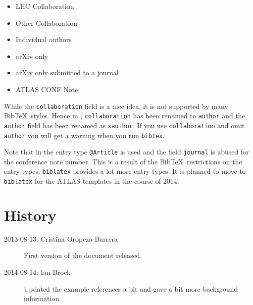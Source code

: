 \documentclass[UKenglish]{latex/atlasdoc}
\newcommand*{\BibTeX}{Bib\TeX}
\begin{document}
\begin{itemize}
\item LHC Collaboration~\cite{lhcCollaboration:2012}
\item Other Collaboration~\cite{otherCollaboration:2007}
\item Individual authors~\cite{authors:2008}
\item arXiv only~\cite{arxivOnly:2009}
\item arXiv only submitted to a journal~\cite{arxivSub:2011}
\item ATLAS CONF Note~\cite{atlasConf:2012} 
\end{itemize}

While the \texttt{collaboration} field is a nice idea, it is not supported by many \BibTeX\ styles.
Hence in , \texttt{collaboration} has been renamed to \texttt{author} and
the \texttt{author} field has been renamed as \texttt{xauthor}. If you use \texttt{collaboration} and omit
\texttt{author} you will get a warning when you run \texttt{bibtex}.

Note that in  the entry type \texttt{@Article} is used and the field \texttt{journal} 
is abused for the conference note number. This is a result of the \BibTeX\ restrictions on the entry types.
\texttt{biblatex} provides a lot more entry types. It is planned to move to \texttt{biblatex} for the ATLAS templates
in the course of 2014.


\section*{History}

\begin{description}
\item[2013-08-13: Cristina Oropeza Barrera] First version of the document released.
\item[2014-08-14: Ian Brock] Updated the example references a bit and gave a bit more background information.
\end{description}

\printbibliography
% 
% 
\end{document}

